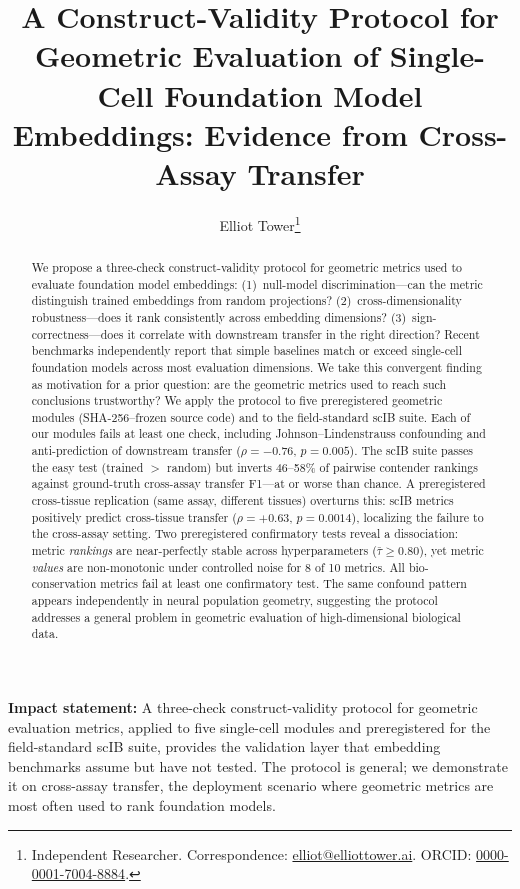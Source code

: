 \documentclass[10pt,letterpaper]{article}
\title{A Construct-Validity Protocol for Geometric Evaluation of Single-Cell Foundation Model Embeddings: Evidence from Cross-Assay Transfer}
\author{Elliot Tower\thanks{Independent Researcher. Correspondence: \href{mailto:elliot@elliottower.ai}{elliot@elliottower.ai}. ORCID: \href{https://orcid.org/0000-0001-7004-8884}{0000-0001-7004-8884}.}}
\begin{document}
\maketitle

\begin{abstract}
We propose a three-check construct-validity protocol for geometric metrics used to evaluate foundation model embeddings: (1)~null-model discrimination---can the metric distinguish trained embeddings from random projections? (2)~cross-dimensionality robustness---does it rank consistently across embedding dimensions? (3)~sign-correctness---does it correlate with downstream transfer in the right direction? Recent benchmarks independently report that simple baselines match or exceed single-cell foundation models across most evaluation dimensions. We take this convergent finding as motivation for a prior question: are the geometric metrics used to reach such conclusions trustworthy? We apply the protocol to five preregistered geometric modules (SHA-256--frozen source code) and to the field-standard scIB suite. Each of our modules fails at least one check, including Johnson--Lindenstrauss confounding and anti-prediction of downstream transfer ($\rho = -0.76$, $p = 0.005$). The scIB suite passes the easy test (trained $>$ random) but inverts 46--58\% of pairwise contender rankings against ground-truth cross-assay transfer F1---at or worse than chance. A preregistered cross-tissue replication (same assay, different tissues) overturns this: scIB metrics positively predict cross-tissue transfer ($\rho = +0.63$, $p = 0.0014$), localizing the failure to the cross-assay setting. Two preregistered confirmatory tests reveal a dissociation: metric \emph{rankings} are near-perfectly stable across hyperparameters ($\bar{\tau} \geq 0.80$), yet metric \emph{values} are non-monotonic under controlled noise for 8 of 10 metrics. All bio-conservation metrics fail at least one confirmatory test. The same confound pattern appears independently in neural population geometry, suggesting the protocol addresses a general problem in geometric evaluation of high-dimensional biological data.
\end{abstract}

\noindent\textbf{Impact statement:} A three-check construct-validity protocol for geometric evaluation metrics, applied to five single-cell modules and preregistered for the field-standard scIB suite, provides the validation layer that embedding benchmarks assume but have not tested. The protocol is general; we demonstrate it on cross-assay transfer, the deployment scenario where geometric metrics are most often used to rank foundation models.
\end{document}
